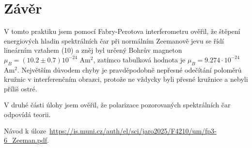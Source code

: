 \documentclass[a4paper,11pt]{article}
\begin{document}
\section{Závěr}

V tomto praktiku jsem pomocí Fabry-Perotova interferometru ověřil, že štěpení energiových hladin spektrálních čar při normálním Zeemanově jevu se řídí lineárním vztahem (10) a zněj byl určený Bohrův magneton $ \mu_B = (10.2 \pm 0.7) 10^{-24} $ Am$ ^2 $, zatímco tabulková hodnota je $ \mu_B = 9.274 \cdot 10^{-24} $ Am$ ^2 $. Největším důvodem chyby je pravděpodobně nepřesné odečítání poloměrů kružnic v interferenčním obrazci, protože ne vždycky byli přesné kružnice a nebyli příliš ostré.


V druhé části úlohy jsem ověřil, že polarizace pozorovaných spektrálních čar odpovídá teorii.

\begin{thebibliography}{0}
 Návod k úloze~\url{https://is.muni.cz/auth/el/sci/jaro2025/F4210/um/fp3-6_Zeeman.pdf}.   
\end{thebibliography}
\end{document}
